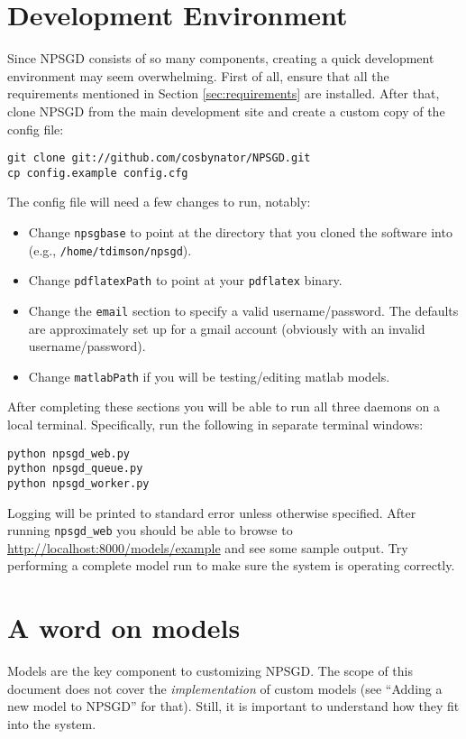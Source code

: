 \documentclass{article}
\begin{document}
\section{Development Environment}
Since NPSGD consists of so many components, creating a quick development
environment may seem overwhelming. First of all, ensure that all the 
requirements mentioned in Section \ref{sec:requirements} are installed. 
After that, clone NPSGD from the
main development site and create a custom copy of the config file:
\begin{verbatim}
git clone git://github.com/cosbynator/NPSGD.git
cp config.example config.cfg
\end{verbatim}

The config file will need a few changes to run, notably:
\begin{itemize}
    \item Change \texttt{npsgbase} to point at the directory that you cloned the
    software into (e.g., \texttt{/home/tdimson/npsgd}).
    \item Change \texttt{pdflatexPath} to point at your \texttt{pdflatex}
    binary.
    \item Change the \texttt{email} section to specify a valid
    username/password. The defaults are approximately set up for a gmail
    account (obviously with an invalid username/password).
    \item Change \texttt{matlabPath} if you will be testing/editing matlab
    models.
\end{itemize}

After completing these sections you will be able to run all three daemons on a
local terminal. Specifically, run the following in separate terminal windows:
\begin{verbatim}
python npsgd_web.py
python npsgd_queue.py
python npsgd_worker.py
\end{verbatim}
Logging will be printed to standard error unless otherwise specified. After
running \texttt{npsgd\_web} you should be able to browse to
\url{http://localhost:8000/models/example} and see some sample output. Try
performing a complete model run to make sure the system is operating correctly.

\section{A word on models}
Models are the key component to customizing NPSGD. The scope of this document
does not cover the \textit{implementation} of custom models (see ``Adding a new
model to NPSGD'' for that). Still, it is important to understand how they fit
into the system.
\end{document}
